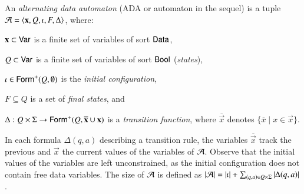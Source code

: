 \documentclass[10pt]{llncs}
\begin{document}
An \emph{alternating data automaton} (ADA or automaton in the sequel)
is a tuple $\mathcal{A} = \left\langle \mathbf x,Q,\iota,F,\Delta \right\rangle$,
where: \begin{compactitem}
%
\item $\mathbf x \subset \mathsf{Var}$ is a finite set of variables of sort
  $\mathsf{Data}$,
%
\item $Q \subset \mathsf{Var}$ is a finite set of variables of sort $\mathsf{Bool}$
  (\emph{states}),
%
\item $\iota \in \mathsf{Form}^+(Q,\emptyset)$ is the \emph{initial
  configuration},
%
\item $F \subseteq Q$ is a set of \emph{final states}, and
%
\item $\Delta : Q \times \Sigma \rightarrow
  \mathsf{Form}^+(Q,\overline{\mathbf x}\cup\mathbf x)$ is a \emph{transition
    function}, where $\overline{\vec{x}}$ denotes $\{\overline{x} \mid
  x \in \vec{x}\}$.
\end{compactitem}
In each formula $\Delta(q,a)$ describing a transition rule, the
variables $\overline{\vec{x}}$ track the previous and $\vec{x}$ the
current values of the variables of $\mathcal{A}$. Observe that the initial
values of the variables are left unconstrained, as the initial
configuration does not contain free data variables. The size of $\mathcal{A}$
is defined as ${|{\mathcal{A}}|} = {|{\iota}|} + \sum_{(q,a) \in
  Q\times\Sigma}{|{\Delta(q,a)}|}$.
\end{document}
